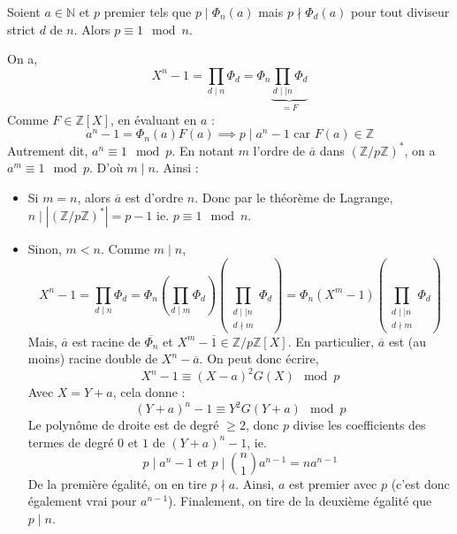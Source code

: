 


	
	
	
	\begin{lemma}
		\label{dirichlet-faible-1}
		Soient $a \in \mathbb{N}$ et $p$ premier tels que $p \mid \Phi_n(a)$ mais $p \nmid \Phi_d(a)$ pour tout diviseur strict $d$ de $n$. Alors $p \equiv 1 \mod n$.
	\end{lemma}
	
	\begin{demonstration}
		On a,
		\[ X^n - 1 = \prod_{d \mid n} \Phi_d = \Phi_n \underbrace{\prod_{d \mid \mid n} \Phi_d}_{= F} \]
		Comme $F \in \mathbb{Z}[X]$, en évaluant en $a$ :
		\[ a^n - 1 = \Phi_n(a) F(a) \implies p \mid a^n - 1 \text{ car } F(a) \in \mathbb{Z} \]
		Autrement dit, $a^n \equiv 1 \mod p$. En notant $m$ l'ordre de $\overline{a}$ dans $(\mathbb{Z}/p\mathbb{Z})^*$, on a $a^m \equiv 1 \mod p$. D'où $m \mid n$. Ainsi :
		\begin{itemize}
			\item Si $m = n$, alors $\overline{a}$ est d'ordre $n$. Donc par le théorème de Lagrange, $n \mid |(\mathbb{Z}/p\mathbb{Z})^*| = p-1$ ie. $p \equiv 1 \mod n$.
			\item Sinon, $m < n$. Comme $m \mid n$,
			\[ X^n-1 = \prod_{d \mid n} \Phi_d = \Phi_n \left ( \prod_{d \mid m} \Phi_d \right ) \left ( \prod_{\substack{d \mid \mid n \\ d \nmid m}} \Phi_d \right ) = \Phi_n (X^m - 1) \left ( \prod_{\substack{d \mid \mid n \\ d \nmid m}} \Phi_d \right ) \]
			Mais, $\overline{a}$ est racine de $\overline{\Phi_n}$ et $X^m - \overline{1} \in \mathbb{Z}/p\mathbb{Z}[X]$. En particulier, $\overline{a}$ est (au moins) racine double de $X^n - \overline{a}$. On peut donc écrire,
			\[ X^n - 1 \equiv (X-a)^2 G(X) \mod p \]
			Avec $X = Y+a$, cela donne :
			\[ (Y+a)^n - 1 \equiv Y^2 G(Y+a) \mod p \]
			Le polynôme de droite est de degré $\geq 2$, donc $p$ divise les coefficients des termes de degré $0$ et $1$ de $(Y+a)^n-1$, ie.
			\[ p \mid a^n - 1 \text{ et } p \mid \binom{n}{1} a^{n-1} = n a^{n-1} \]
			De la première égalité, on en tire $p \nmid a$. Ainsi, $a$ est premier avec $p$ (c'est donc également vrai pour $a^{n-1}$). Finalement, on tire de la deuxième égalité que $p \mid n$.
		\end{itemize}
	\end{demonstration}
	
